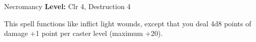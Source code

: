 {Necromancy}
{
	\textbf{Level:}
	Clr 4, Destruction 4\\
}
{
	This spell functions like inflict light wounds, except that you deal 4d8 points of damage +1 point per caster level (maximum +20).

}
